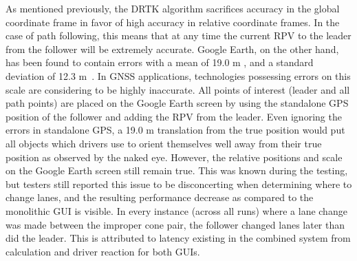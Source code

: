 As mentioned previously, the DRTK algorithm sacrifices accuracy in the global coordinate frame in favor of high accuracy in relative coordinate frames. In the case of path following, this means that at any time the current RPV to the leader from the follower will be extremely accurate. 
Google Earth, on the other hand, has been found to contain errors with a mean of 19.0 m , and a standard deviation of 12.3 m~\cite{ge_accuracy}. In GNSS applications, technologies possessing errors on this scale are considering to be highly inaccurate. All points of interest (leader and all path points) are placed on the Google Earth screen by using the standalone GPS position of the follower and adding the RPV from the leader. Even ignoring the errors in standalone GPS, a 19.0 m translation from the true position would put all objects which drivers use to orient themselves well away from their true position as observed by the naked eye. However, the relative positions and scale on the Google Earth screen still remain true. This was known during the testing, but testers still reported this issue to be disconcerting when determining where to change lanes, and the resulting performance decrease as compared to the monolithic GUI is visible. In every instance (across all runs) where a lane change was made between the improper cone pair, the follower changed lanes later than did the leader. This is attributed to latency existing in the combined system from calculation and driver reaction for both GUIs.

